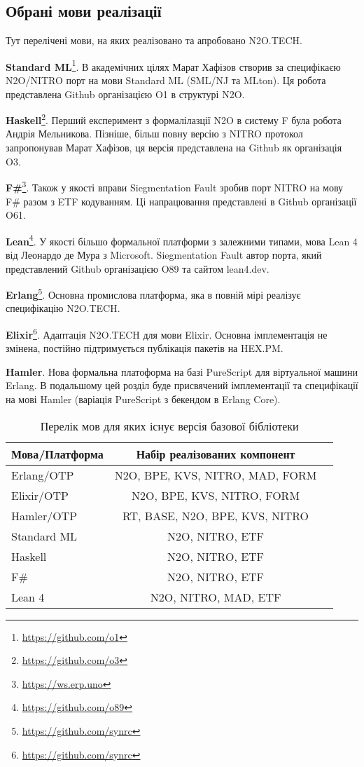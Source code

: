 \subsection{Обрані мови реалізації}

Тут перелічені мови, на яких реалізовано та апробовано N2O.TECH.

\textbf{Standard ML}\footnote{\url{https://github.com/o1}}. В академічних цілях Марат Хафізов створив
за специфікаєю N2O/NITRO порт на мови Standard ML (SML/NJ та MLton).
Ця робота представлена Github організацією O1 в структурі N2O.

\textbf{Haskell}\footnote{\url{https://github.com/o3}}. Перший експеримент з формалілазції N2O в систему F
була робота Андрія Мельникова. Пізніше, більш повну версію з NITRO протокол
запропонував Марат Хафізов, ця версія представлена на Github як організація O3.

\textbf{F\#}\footnote{\url{https://ws.erp.uno}}. Також у якості вправи Siegmentation Fault зробив порт NITRO
на мову F\# разом з ETF кодуванням. Ці напрацювання представлені в Github
організації O61.

\textbf{Lean}\footnote{\url{https://github.com/o89}}. У якості більшо формальної платформи з залежними типами,
мова Lean 4 від Леонардо де Мура з Microsoft. Siegmentation Fault автор порта,
який представлений Github організацією O89 та сайтом lean4.dev.

\textbf{Erlang}\footnote{\url{https://github.com/synrc}}. Основна промислова платформа, яка в повній мірі реалізує
специфікацію N2O.TECH.

\textbf{Elixir}\footnote{\url{https://github.com/synrc}}. Адаптація N2O.TECH для мови Elixir.
Основна імплементація не змінена, постійно підтримується публікація пакетів на HEX.PM.

\textbf{Hamler}. Нова формальна платоформа на базі PureScript для віртуальної машини Erlang.
В подальшому цей розділ буде присвячений імплементації та специфікації
на мові Hamler (варіація PureScript з бекендом в Erlang Core).

\begin{table}[h]
\begin{center}
\caption{Перелік мов для яких існує версія базової бібліотеки}
\begin{tabular}{lcc}
\hline
\textbf{Мова/Платформа} & \textbf{Набір реалізованих компонент} \\
\hline
Erlang/OTP & N2O, BPE, KVS, NITRO, MAD, FORM \\
Elixir/OTP & N2O, BPE, KVS, NITRO, FORM \\
\hline
\rowcolor{LightGray}
Hamler/OTP & RT, BASE, N2O, BPE, KVS, NITRO \\
\hline
Standard ML & N2O, NITRO, ETF \\
Haskell & N2O, NITRO, ETF \\
F\# & N2O, NITRO, ETF \\
Lean 4 & N2O, NITRO, MAD, ETF \\
\hline
\end{tabular}
\end{center}
\end{table}

